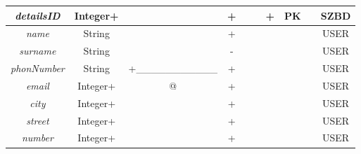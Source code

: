 \documentclass[12pt,oneside]{report}
\begin{document}
\begin{enumerate}[start=10,label={\bfseries REL\textbackslash\arabic*}]
\begin{table}[H]
\begin{tabular}{|c|c|c|c|c|c|c|c|c|c|}
			\hline			
			\textit{detailsID}&Integer+&&+&&&+&PK&&SZBD\\	
			\hline			
			\textit{name}&String&&+&&&&&&USER\\	
			\hline			
			\textit{surname}&String&&-&&&&&&USER\\	
			\hline			
			\textit{phonNumber}&String&+\_\_\_\_\_\_\_\_\_\_\_&+&&&&&&USER\\	
			\hline			
			\textit{email}&Integer+&\underline{\qquad\qquad}@\underline{\qquad}&+&&&&&&USER\\	
			\hline			
			\textit{city}&Integer+&&+&&&&&&USER\\	
			\hline			
			\textit{street}&Integer+&&+&&&&&&USER\\	
			\hline			
			\textit{number}&Integer+&&+&&&&&&USER\\	
			\hline
		\end{tabular}
	\end{table}
	

\end{enumerate}
\end{document}

